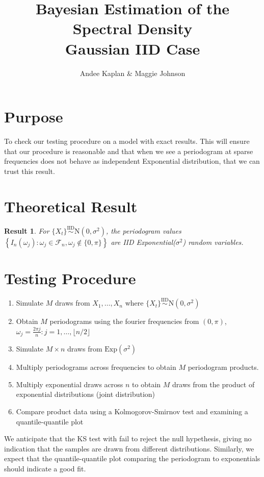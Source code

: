 \documentclass{article}\usepackage[]{graphicx}\usepackage[]{color}
\title{Bayesian Estimation of the Spectral Density \\ {\small Gaussian IID Case}}
\author{Andee Kaplan \& Maggie Johnson}
\theoremstyle{plain}
\newtheorem*{res}{Result}
\begin{document}
\maketitle

\section*{Purpose}
To check our testing procedure on a model with exact results. This will ensure that our procedure is reasonable and that when we see a periodogram at sparse frequencies does not behave as independent Exponential distribution, that we can trust this result.

\section*{Theoretical Result}

\begin{res}
For $\{X_t\} \stackrel{\text{IID}}{\sim} \text{N}(0,\sigma^2)$, the periodogram values $\left\{ I_n(\omega_j): \omega_j \in \mathcal{F}_n, \omega_j \not\in \{0,\pi\} \right\}$ are IID Exponential($\sigma^2$) random variables.
\end{res}

\section*{Testing Procedure}

\begin{enumerate}
\item Simulate $M$ draws from $X_1,\dots, X_n$ where $\{X_t\} \stackrel{\text{IID}}{\sim} \text{N}(0,\sigma^2)$
\item Obtain $M$ periodograms using the fourier frequencies from $(0, \pi)$, $\omega_j = \frac{2\pi j}{n}: j = 1, \dots, \lfloor n/2 \rfloor$
\item Simulate $M \times n$ draws from $\text{Exp}(\sigma^2)$
\item Multiply periodograms across frequencies to obtain $M$ periodogram products.
\item Multiply exponential draws across $n$ to obtain $M$ draws from the product of exponential distributions (joint distribution)
\item Compare product data using a Kolmogorov-Smirnov test and examining a quantile-quantile plot
\end{enumerate}

We anticipate that the KS test with fail to reject the null hypethesis, giving no indication that the samples are drawn from different distributions. Similarly, we expect that the quantile-quantile plot comparing the periodogram to exponentials should indicate a good fit.
\end{document}
